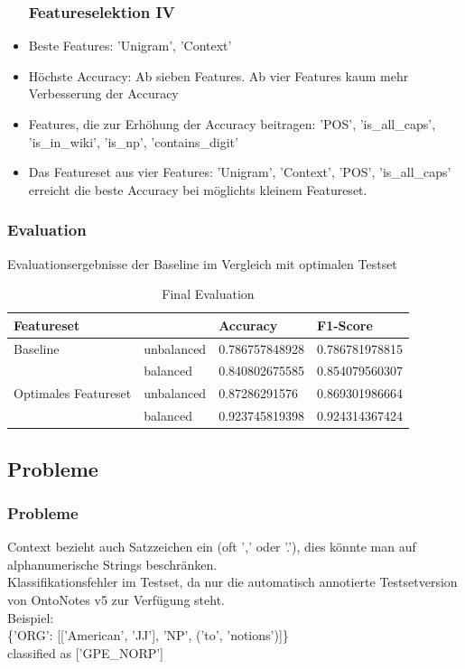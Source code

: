 \documentclass{beamer}
\begin{document}
	\begin{frame}
		\begin{itemize}
			\frametitle{Featureselektion IV}
			\item Beste Features: 'Unigram', 'Context'\\
			\item Höchste Accuracy: Ab sieben Features. Ab vier Features kaum mehr Verbesserung der Accuracy \\
			\item Features, die zur Erhöhung der Accuracy beitragen: 'POS', 'is\_all\_caps', 'is\_in\_wiki', 'is\_np', 'contains\_digit'\\
			\item Das Featureset aus vier Features: 'Unigram', 'Context', 'POS', 'is\_all\_caps' erreicht die beste Accuracy bei möglichts kleinem Featureset.
		\end{itemize}
	\end{frame}
	\begin{frame}
		\frametitle{Evaluation}
		Evaluationsergebnisse der Baseline im Vergleich mit optimalen Testset
				\begin{table}
					\caption{Final Evaluation}
					\begin{tabularx}{\textwidth}{llll}
						Featureset & & Accuracy & F1-Score\\
						\toprule
						Baseline & unbalanced & 0.786757848928 &  0.786781978815\\
								 & balanced & 0.840802675585 & 0.854079560307\\
						Optimales Featureset	 & unbalanced & 0.87286291576 & 0.869301986664\\
								 & balanced & 0.923745819398 & 0.924314367424\\
						\bottomrule
					\end{tabularx}
					\label{tab:allf2}
				\end{table}	
		
		
		
		
	\end{frame}
		\subsection{Probleme}
		\begin{frame}
			\frametitle{Probleme}
			Context bezieht auch Satzzeichen ein (oft ',' oder '.'), dies könnte man auf alphanumerische Strings beschränken.\\
			
			Klassifikationsfehler im Testset, da nur die automatisch annotierte Testsetversion von OntoNotes v5 zur Verfügung steht.\\
			
			Beispiel:\\
			\{'ORG': [['American', 'JJ'], 'NP', ('to', 'notions')]\}\\classified as ['GPE\_NORP']\\
			
		\end{frame}
\end{document}
